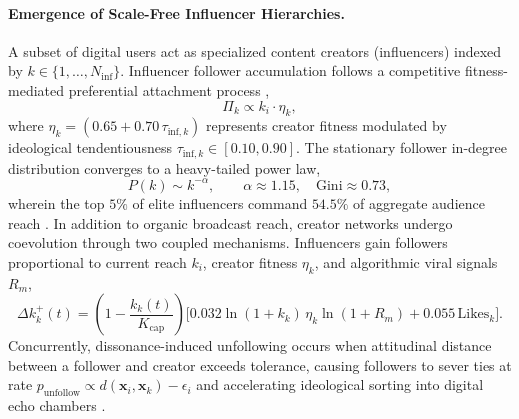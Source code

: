 \documentclass{article}
\begin{document}
\paragraph{Emergence of Scale-Free Influencer Hierarchies.}
A subset of digital users act as specialized content creators (influencers) indexed by $k \in \{1, \dots, N_{\mathrm{inf}}\}$. Influencer follower accumulation follows a competitive fitness-mediated preferential attachment process \citep{barabasi1999emergence, bianconi2001competition},
\begin{equation}
    \Pi_k \propto k_i \cdot \eta_k,
    \label{eq:preferential_attachment_methods}
\end{equation}
where $\eta_k = (0.65 + 0.70\,\tau_{\mathrm{inf}, k})$ represents creator fitness modulated by ideological tendentiousness $\tau_{\mathrm{inf}, k} \in [0.10, 0.90]$. The stationary follower in-degree distribution converges to a heavy-tailed power law,
\begin{equation}
    P(k) \sim k^{-\alpha}, \qquad \alpha \approx 1.15, \quad \mathrm{Gini} \approx 0.73,
    \label{eq:follower_power_law}
\end{equation}
wherein the top $5\%$ of elite influencers command $54.5\%$ of aggregate audience reach \citep{bakshy2011everyone}. In addition to organic broadcast reach, creator networks undergo coevolution through two coupled mechanisms. Influencers gain followers proportional to current reach $k_i$, creator fitness $\eta_k$, and algorithmic viral signals $R_m$,
\begin{equation}
    \Delta k_k^+(t) = \left(1 - \frac{k_k(t)}{K_{\mathrm{cap}}}\right) \Big[0.032\ln(1 + k_k)\,\eta_k \ln(1 + R_m) + 0.055\,\mathrm{Likes}_k\Big].
    \label{eq:follower_gain}
\end{equation}
Concurrently, dissonance-induced unfollowing occurs when attitudinal distance between a follower and creator exceeds tolerance, causing followers to sever ties at rate $p_{\mathrm{unfollow}} \propto d(\mathbf{x}_i, \mathbf{x}_k) - \epsilon_i$ and accelerating ideological sorting into digital echo chambers \citep{sasahara2021social}.
\end{document}
